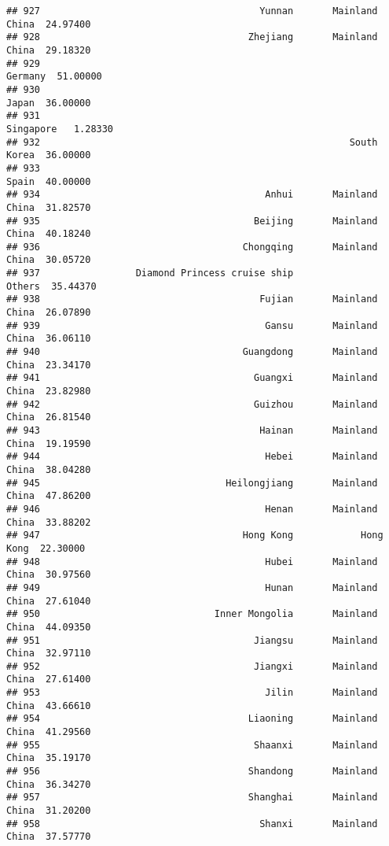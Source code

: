 \documentclass[
]{article}
\begin{document}
\begin{verbatim}
## 927                                       Yunnan       Mainland China  24.97400
## 928                                     Zhejiang       Mainland China  29.18320
## 929                                                           Germany  51.00000
## 930                                                             Japan  36.00000
## 931                                                         Singapore   1.28330
## 932                                                       South Korea  36.00000
## 933                                                             Spain  40.00000
## 934                                        Anhui       Mainland China  31.82570
## 935                                      Beijing       Mainland China  40.18240
## 936                                    Chongqing       Mainland China  30.05720
## 937                 Diamond Princess cruise ship               Others  35.44370
## 938                                       Fujian       Mainland China  26.07890
## 939                                        Gansu       Mainland China  36.06110
## 940                                    Guangdong       Mainland China  23.34170
## 941                                      Guangxi       Mainland China  23.82980
## 942                                      Guizhou       Mainland China  26.81540
## 943                                       Hainan       Mainland China  19.19590
## 944                                        Hebei       Mainland China  38.04280
## 945                                 Heilongjiang       Mainland China  47.86200
## 946                                        Henan       Mainland China  33.88202
## 947                                    Hong Kong            Hong Kong  22.30000
## 948                                        Hubei       Mainland China  30.97560
## 949                                        Hunan       Mainland China  27.61040
## 950                               Inner Mongolia       Mainland China  44.09350
## 951                                      Jiangsu       Mainland China  32.97110
## 952                                      Jiangxi       Mainland China  27.61400
## 953                                        Jilin       Mainland China  43.66610
## 954                                     Liaoning       Mainland China  41.29560
## 955                                      Shaanxi       Mainland China  35.19170
## 956                                     Shandong       Mainland China  36.34270
## 957                                     Shanghai       Mainland China  31.20200
## 958                                       Shanxi       Mainland China  37.57770

\end{verbatim}
\end{document}
